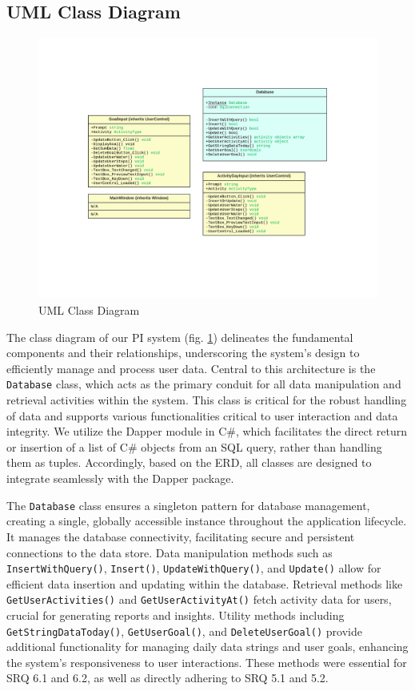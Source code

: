 \documentclass[12pt]{article}
\begin{document}
\subsection{UML Class Diagram}

\begin{figure}[!ht]
  \centering
  \includegraphics[width = 0.7\linewidth]{UML Class diagram}
  \caption{UML Class Diagram}
  \label{fig:Class}
\end{figure}

The class diagram of our PI system (fig. \ref{fig:Class}) delineates the
fundamental components and their relationships, underscoring the system's
design to efficiently manage and process user data. Central to this
architecture is the \texttt{Database} class, which acts as the primary conduit for all
data manipulation and retrieval activities within the system. This class is
critical for the robust handling of data and supports various functionalities
critical to user interaction and data integrity. We utilize the Dapper module 
in C\#, which facilitates the direct return or insertion of a list of 
C\# objects from an SQL query, rather than handling them as tuples. 
Accordingly, based on the ERD, all classes are designed to integrate seamlessly
with the Dapper package.\par

The \texttt{Database} class ensures a singleton pattern for database management,
creating a single, globally accessible instance throughout the application
lifecycle. It manages the database connectivity, facilitating secure and
persistent connections to the data store. Data manipulation methods such as
\texttt{InsertWithQuery()}, \texttt{Insert()}, \texttt{UpdateWithQuery()}, and \texttt{Update()} allow for
efficient data insertion and updating within the database. Retrieval methods
like \texttt{GetUserActivities()} and \texttt{GetUserActivityAt()} fetch activity data for users,
crucial for generating reports and insights. Utility methods including
\texttt{GetStringDataToday()}, \texttt{GetUserGoal()}, and \texttt{DeleteUserGoal()} provide additional
functionality for managing daily data strings and user goals, enhancing the
system’s responsiveness to user interactions. These methods were essential for
SRQ 6.1 and 6.2, as well as directly adhering to SRQ 5.1 and 5.2. \par
\end{document}

